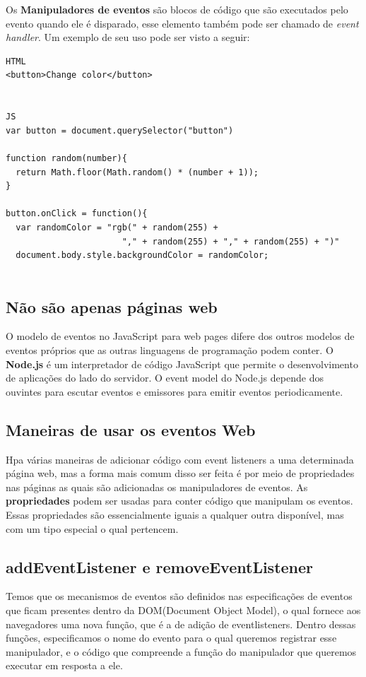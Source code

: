 \documentclass[12pt, a4paper]{paper}
\begin{document}
Os \textbf{Manipuladores de eventos} são blocos de código que são executados pelo 
evento quando ele é disparado, esse elemento também pode ser chamado de 
\textit{event handler}. Um exemplo de seu uso pode ser visto a seguir:

\begin{verbatim}
HTML 
<button>Change color</button>


JS
var button = document.querySelector("button")

function random(number){
  return Math.floor(Math.random() * (number + 1));
}

button.onClick = function(){
  var randomColor = "rgb(" + random(255) + 
                       "," + random(255) + "," + random(255) + ")"
  document.body.style.backgroundColor = randomColor;


\end{verbatim}


\subsection{Não são apenas páginas web} %
\label{sub:Não são apenas páginas web}
O modelo de eventos no JavaScript para web pages difere dos outros modelos de eventos 
próprios que as outras linguagens de programação podem conter. O \textbf{Node.js} é 
um interpretador de código JavaScript que permite o desenvolvimento de aplicações do 
lado do servidor. O event model do Node.js depende dos ouvintes para escutar eventos e 
emissores para emitir eventos periodicamente.

\subsection{Maneiras de usar os eventos Web} %
\label{sub:Maneiras de usar os eventos Web}
Hpa várias maneiras de adicionar código com event listeners a uma determinada página 
web, mas a forma mais comum disso ser feita é por meio de propriedades nas páginas as 
quais são adicionadas os manipuladores de eventos. As \textbf{propriedades} podem ser 
usadas para conter código que manipulam os eventos. Essas propriedades são 
essencialmente iguais a qualquer outra disponível, mas com um tipo especial o qual 
pertencem.

\subsection{addEventListener e removeEventListener} %
\label{sub:addEventListener e removeEventListener}
Temos que os mecanismos de eventos são definidos nas especificações de eventos que 
ficam presentes dentro da DOM(Document Object Model), o qual fornece aos navegadores 
uma nova função, que é a de adição de eventlisteners. Dentro dessas funções, 
especificamos o nome do evento para o qual queremos registrar esse manipulador, e o 
código que compreende a função do manipulador que queremos executar em resposta a ele. 
\end{document}

